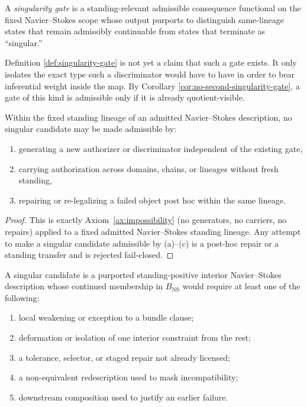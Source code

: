 \begin{definition}\label{def:singularity-gate}
A \emph{singularity gate} is a standing-relevant admissible consequence functional on the fixed
Navier--Stokes scope whose output purports to distinguish same-lineage states that remain admissibly
continuable from states that terminate as ``singular.''
\end{definition}

\begin{remark}
Definition \ref{def:singularity-gate} is not yet a claim that such a gate exists. It only isolates the
exact type such a discriminator would have to have in order to bear inferential weight inside the map.
By Corollary \ref{cor:no-second-singularity-gate}, a gate of this kind is admissible only if it is already
quotient-visible.
\end{remark}

\begin{proposition}\label{prop:no-gcr}
Within the fixed standing lineage of an admitted Navier--Stokes description, no singular candidate may
be made admissible by:
\begin{enumerate}[label=(\alph*), leftmargin=2.2em]
\item generating a new authorizer or discriminator independent of the existing gate,
\item carrying authorization across domains, chains, or lineages without fresh standing,
\item repairing or re-legalizing a failed object post hoc within the same lineage.
\end{enumerate}
\end{proposition}

\begin{proof}
This is exactly Axiom~\ref{ax:impossibility} (no generators, no carriers, no repairs) applied to a fixed admitted
Navier--Stokes standing lineage. Any attempt to make a singular candidate admissible by (a)--(c) is a post-hoc repair
or a standing transfer and is rejected fail-closed.
\end{proof}

\begin{definition}\label{def:singular-candidate}
A singular candidate is a purported standing-positive interior Navier--Stokes description whose
continued membership in $B_{\mathrm{NS}}$ would require at least one of the following:
\begin{enumerate}[label=(S\arabic*), leftmargin=2.2em]
\item local weakening or exception to a bundle clause;
\item deformation or isolation of one interior constraint from the rest;
\item a tolerance, selector, or staged repair not already licensed;
\item a non-equivalent redescription used to mask incompatibility;
\item downstream composition used to justify an earlier failure.
\end{enumerate}
\end{definition}

